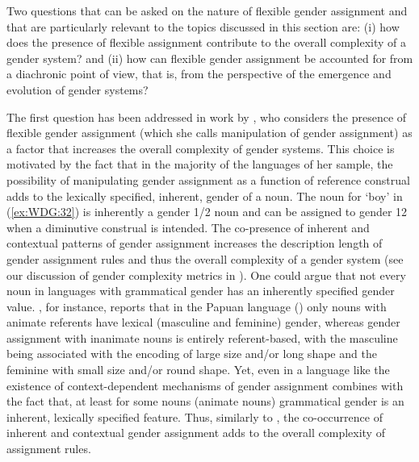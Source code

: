 \documentclass[output=collectionpaper]{langsci/langscibook}
\begin{document}
Two questions that can be asked on the nature of flexible gender assignment and that are particularly relevant to the topics discussed in this section are: (i) how does the presence of flexible assignment contribute to the overall complexity of a gender system? and (ii) how can flexible gender assignment be accounted for from a diachronic point of view, that is, from the perspective of the emergence and evolution of gender systems?

The first question has been addressed in work by \cite{DiGarbo2014,DiGarbo2016}, who considers the presence of flexible gender assignment (which she calls manipulation of gender assignment) as a factor that increases the overall complexity of gender systems. This choice is motivated by the fact that in the majority of the languages of her sample, the possibility of manipulating gender assignment as a function of reference construal adds to the lexically specified, inherent, gender of a noun. The noun for `boy' in  (\ref{ex:WDG:32}) is inherently a gender 1/2 noun and can be assigned to gender 12 when a diminutive construal is intended. The co-presence of inherent and contextual patterns of gender assignment increases the description length of gender assignment rules and thus the overall complexity of a gender system (see our discussion of gender complexity metrics in ). One could argue that not every noun in languages with grammatical gender has an inherently specified gender value. \cite[42]{Aikhenvald2012}, for instance, reports that in the Papuan language  () only nouns with animate referents have lexical (masculine and feminine) gender, whereas gender assignment with inanimate nouns is entirely referent-based, with the masculine being associated with the encoding of large size and/or long shape and the feminine with small size and/or round shape. Yet, even in a language like  the existence of context-dependent mechanisms of gender assignment combines with the fact that, at least for some nouns (animate nouns) grammatical gender is an inherent, lexically specified feature. Thus, similarly to , the co-occurrence of inherent and contextual gender assignment adds to the overall complexity of assignment rules.
\end{document}
